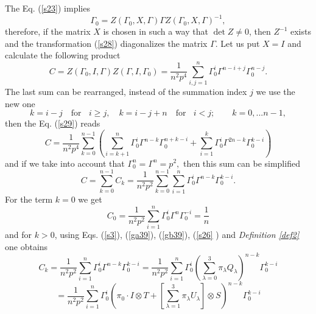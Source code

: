 \documentclass[a4paper,a4paper]{article}
\begin{document}
\noindent The Eq. (\ref{s23}) implies 
\begin{equation}
\Gamma _{0}=Z(\Gamma _{0},X,\Gamma )\Gamma Z(\Gamma _{0},X,\Gamma )^{-1},
\label{s28}
\end{equation}%
therefore, if the matrix $X$ is chosen in such a way that $\det Z\neq 0$,
then $Z^{-1}$ exists and the transformation (\ref{s28}) diagonalizes the
matrix $\Gamma $. Let us put $X=I$ and calculate the following product 
\begin{equation}
C=Z(\Gamma _{0},I,\Gamma )Z(\Gamma ,I,\Gamma _{0})=\frac{1}{n^{2}p^{4}}%
\sum_{i,j=1}^{n}\Gamma _{0}^{i}\Gamma ^{n-i+j}\Gamma _{0}^{n-j}.  \label{s29}
\end{equation}%
The last sum can be rearranged, instead of the summation index $j$ we use
the new one 
\begin{equation*}
k=i-j\mathbf{\quad }\mathrm{for}\mathbf{\ }\text{ }i\geq j,\mathbf{\quad }%
k=i-j+n\mathbf{\quad }\mathrm{for}\mathbf{\ }\text{ }i<j;\mathbf{\qquad }%
k=0,...n-1,
\end{equation*}%
then the Eq. (\ref{s29}) reads 
\begin{equation}
C=\frac{1}{n^{2}p^{4}}\sum_{k=0}^{n-1}\left( \sum_{i=k+1}^{n}\Gamma
_{0}^{i}\Gamma ^{n-k}\Gamma _{0}^{n+k-i}+\sum_{i=1}^{k}\Gamma _{0}^{i}\Gamma
^{2n-k}\Gamma _{0}^{k-i}\right)  \label{s31}
\end{equation}%
and if we take into account that $\Gamma _{0}^{n}=\Gamma ^{n}=p^{2},$ then
this sum can be simplified 
\begin{equation}
C=\sum_{k=0}^{n-1}C_{k}=\frac{1}{n^{2}p^{2}}\sum_{k=0}^{n-1}\sum_{i=1}^{n}%
\Gamma _{0}^{i}\Gamma ^{n-k}\Gamma _{0}^{k-i}.  \label{s32}
\end{equation}%
For the term $k=0$ we get 
\begin{equation}
C_{0}=\frac{1}{n^{2}p^{2}}\sum_{i=1}^{n}\Gamma _{0}^{i}\Gamma ^{n}\Gamma
_{0}^{-i}=\frac{1}{n}  \label{s33}
\end{equation}%
and for $k>0$, using Eqs. (\ref{s3}), (\ref{ga39}), (\ref{gb39}), (\ref{s26}%
) and \textit{Definition \ref{def2}} one obtains%
\begin{equation}
C_{k}=\frac{1}{n^{2}p^{2}}\sum_{i=1}^{n}\Gamma _{0}^{i}\Gamma ^{n-k}\Gamma
_{0}^{k-i}=\frac{1}{n^{2}p^{2}}\sum_{i=1}^{n}\Gamma _{0}^{i}\left(
\sum_{\lambda =0}^{3}\pi _{\lambda }Q_{\lambda }\right) ^{n-k}\Gamma
_{0}^{k-i}  \label{s34}
\end{equation}%
\begin{equation*}
=\frac{1}{n^{2}p^{2}}\sum_{i=1}^{n}\Gamma _{0}^{i}\left( \pi _{0}\cdot
I\otimes T+\left[ \sum_{\lambda =1}^{3}\pi _{\lambda }U_{\lambda }\right]
\otimes S\right) ^{n-k}\Gamma _{0}^{k-i}
\end{equation*}%
\end{document}
